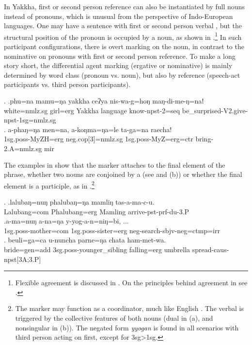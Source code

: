 	
In Yakkha, first or second person reference can also be instantiated by full nouns instead of pronouns, which is unusual from the perspective of Indo-Euro\-pe\-an languages. One may have a sentence with first or second person verbal , but the structural position of the pronoun is occupied by a noun, as shown in \Next.\footnote{Flexible agreement is discussed in . On the principles behind agreement in  see  \citet{Bickel2000On-the-syntax}.} In such participant configurations, there is overt  marking on the noun, in contrast to the nominative on pronouns with first or second person reference. To make a long story short, the differential agent marking (ergative or nominative) is mainly determined  by word class (pronoun vs. noun), but also by reference (speech-act participants vs. third person participants).
	
	\ex. \ag.phu=na mamu=ŋa yakkha ceʔya nis-wa-g=hoŋ maŋ-di-me-ŋ=naǃ\\
	white{\sc =nmlz.sg} girl{\sc =erg} Yakkha language know{\sc -npst-2=seq}  be\_surprised{\sc -V2.give-npst-1sg=nmlz.sg}\\
	\bg. a-phaŋ=ŋa men=na, a-koŋma=ŋa=le   ta-ga=na           raecha!\\
		{\sc 1sg.poss-}MyZH{\sc =erg}  {\sc  neg.cop[3]=nmlz.sg} {\sc 1sg.poss-}MyZ{\sc =erg=ctr} bring{\sc [pst;3.P]-2.A=nmlz.sg} {\sc mir}\\
		 

The examples in  \Next show that the  marker attaches to the final element of the phrase,  whether two nouns are conjoined by a  (see \Next[a] and (b)) or whether the final element is a participle, as in \Next[c].\footnote{The  marker may function as a coordinator, much like English . The verbal  is triggered by the collective  features of both nouns (dual in (a), and nonsingular in (b)). The negated form \emph{yyogan} is found in all scenarios with third person acting on first, except for {\sc 3sg>1sg}.}
	
	\ex. \ag.lalubaŋ=nuŋ   phalubaŋ=ŋa   mamliŋ   tas-a-ma-c-u.\\
	Lalubang{\sc =com} Phalubang{\sc =erg} Mamling arrive{\sc -pst-prf-du-3.P}\\
	\bg.a-ma=nuŋ  a-na=ŋa  y-yog-a-n=niŋ=bi, ...\\
	{\sc 1sg.poss-}mother{\sc =com} {\sc 1sg.poss-}sister{\sc =erg} {\sc neg-}search{\sc [3A;1.P]-sbjv-neg=ctmp=irr}\\
	\bg.   beuli=ga=ca  u-nuncha parne=ŋa    chata    ham-met-wa.\\
	bride{\sc =gen=add} {\sc 3sg.poss-}younger\_sibling  falling{\sc =erg} umbrella spread{\sc -caus-npst[3A;3.P]}\\

